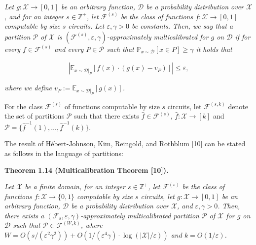 \emph{Let $g:\mathcal{X}\rightarrow[0,1]$ be an arbitrary function, $\mathcal{D}$ be a probability distribution over $\mathcal{X}$, and for an integer $s\in\mathbb{Z}^{+}$, let $\mathcal{F}^{(s)}$ be the class of functions $f:\mathcal{X}\rightarrow[0,1]$ computable by size $s$ circuits. Let $\varepsilon,\gamma>0$ be constants. Then, we say that a partition $\mathcal{P}$ of $\mathcal{X}$ is $(\mathcal{F}^{(s)},\varepsilon,\gamma)$-approximately multicalibrated for $g$ on $\mathcal{D}$ if for every $f\in\mathcal{F}^{(s)}$ and every $P\in\mathcal{P}$ such that $\mathbb{P}_{x\sim\mathcal{D}}[x\in P]\geq\gamma$ it holds that}\par


\[\begin{gathered}
\left|\mathbb{E}_{x\sim\mathcal{D}|_{P}}[f(x)\cdot(g(x)-v_{P})]\right|\leq\varepsilon,
\end{gathered}\]


\emph{where we define $v_{P}:=\mathbb{E}_{x\sim\mathcal{D}|_{P}}[g(x)]$.}\par






For the class $\mathcal{F}^{(s)}$ of functions computable by size $s$ circuits, let $\mathcal{F}^{(s,k)}$ denote the set of partitions $\mathcal{P}$ such that there exists $\hat{f}\in\mathcal{F}^{(s)}$, $\hat{f}:\mathcal{X}\rightarrow[k]$ and $\mathcal{P}=\{\hat{f}^{-1}(1),\dots,\hat{f}^{-1}(k)\}$.\par




The result of Hébert-Johnson, Kim, Reingold, and Rothblum [10] can be stated as follows in the language of partitions:\par





\par\medskip\noindent\textbf{
\textbf{Theorem 1.14}\textbf{ }(Multicalibration Theorem [10])\textbf{.}
}\par



\emph{Let $\mathcal{X}$ be a finite domain, for an integer $s\in\mathbb{Z}^{+}$, let $\mathcal{F}^{(s)}$ be the class of functions $f:\mathcal{X}\rightarrow\{0,1\}$ computable by size $s$ circuits, let $g:\mathcal{X}\rightarrow[0,1]$ be an arbitrary function, $\mathcal{D}$ be a probability distribution over $\mathcal{X}$, and $\varepsilon,\gamma>0$. Then, there exists a $(\mathcal{F}_{s},\varepsilon,\gamma)$-approximately multicalibrated partition $\mathcal{P}$ of $\mathcal{X}$ for $g$ on $\mathcal{D}$ such that $\mathcal{P}\in\mathcal{F}^{(W,k)}$, where $W=O(s/(\varepsilon^{2}\gamma^{2}))+O(1/(\varepsilon^{4}\gamma)\cdot\log(|\mathcal{X}|/\varepsilon))$ and $k=O(1/\varepsilon)$.}\par



